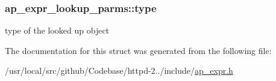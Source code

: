 \subsubsection[{\texorpdfstring{type}{type}}]{ ap\+\_\+expr\+\_\+lookup\+\_\+parms\+::type}\hypertarget{structap__expr__lookup__parms_a41128f8553216bf8632021032445d829}{}\label{structap__expr__lookup__parms_a41128f8553216bf8632021032445d829}
type of the looked up object 

The documentation for this struct was generated from the following file\+:\begin{DoxyCompactItemize}
\item 
/usr/local/src/github/\+Codebase/httpd-\/2../include/\hyperlink{ap__expr_8h}{ap\+\_\+expr.\+h}\end{DoxyCompactItemize}
